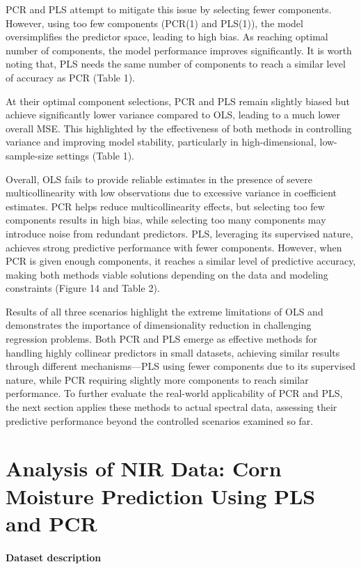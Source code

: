 \documentclass[11pt,twoside,a4paper]{article}
\begin{document}
PCR and PLS attempt to mitigate this issue by selecting fewer components. However, using too few components (PCR(1) and PLS(1)), the model oversimplifies the predictor space, leading to high bias. As reaching optimal number of components, the model performance improves significantly. It is worth noting that, PLS needs the same number of components to reach a similar level of accuracy as PCR (Table 1).

At their optimal component selections, PCR and PLS remain slightly biased but achieve significantly lower variance compared to OLS, leading to a much lower overall MSE. This highlighted by the effectiveness of both methods in controlling variance and improving model stability, particularly in high-dimensional, low-sample-size settings (Table 1).

Overall, OLS fails to provide reliable estimates in the presence of severe multicollinearity with low observations due to excessive variance in coefficient estimates. PCR helps reduce multicollinearity effects, but selecting too few components results in high bias, while selecting too many components may introduce noise from redundant predictors. PLS, leveraging its supervised nature, achieves strong predictive performance with fewer components. However, when PCR is given enough components, it reaches a similar level of predictive accuracy, making both methods viable solutions depending on the data and modeling constraints (Figure 14 and Table 2).

Results of all three scenarios highlight the extreme limitations of OLS and demonstrates the importance of dimensionality reduction in challenging regression problems. Both PCR and PLS emerge as effective methods for handling highly collinear predictors in small datasets, achieving similar results through different mechanisms—PLS using fewer components due to its supervised nature, while PCR requiring slightly more components to reach similar performance. To further evaluate the real-world applicability of PCR and PLS, the next section applies these methods to actual spectral data, assessing their predictive performance beyond the controlled scenarios examined so far.

\section{Analysis of NIR Data: Corn Moisture Prediction Using PLS and PCR}

\paragraph{Dataset description} \ \
\end{document}
